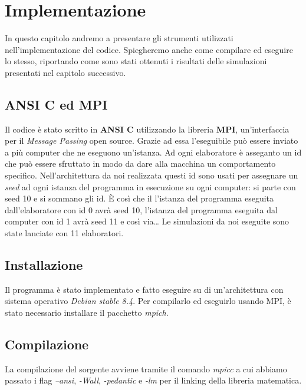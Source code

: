 \chapter{Implementazione}
In questo capitolo andremo a presentare gli strumenti utilizzati
nell'implementazione del codice. Spiegheremo anche come compilare ed eseguire lo
stesso, riportando come sono stati ottenuti i risultati delle simulazioni
presentati nel capitolo successivo.



\section{ANSI C ed MPI}
Il codice è stato scritto in \textbf{ANSI C} utilizzando la libreria
\textbf{MPI}, un'interfaccia per il \textit{Message Passing} open source. Grazie
ad essa l'eseguibile può essere inviato a più computer che ne eseguono
un'istanza. Ad ogni elaboratore è asseganto un id che può essere sfruttato in
modo da dare alla macchina un comportamento specifico.\newline
Nell'architettura da noi realizzata questi id sono usati per assegnare un
\textit{seed} ad ogni istanza del programma in esecuzione su ogni computer: si
parte con seed 10 e si sommano gli id. È così che il l'istanza del programma
eseguita dall'elaboratore con id 0 avrà seed 10, l'istanza del programma
eseguita dal computer con id 1 avrà seed 11 e così via\dots\newline
Le simulazioni da noi eseguite sono state lanciate con 11 elaboratori.



\section{Installazione}
Il programma è stato implementato e fatto eseguire su di un'architettura con
sistema operativo \textit{Debian stable 8.4}. Per compilarlo ed eseguirlo usando
MPI, è stato necessario installare il pacchetto \textit{mpich}.



\section{Compilazione}
La compilazione del sorgente avviene tramite il comando \textit{mpicc} a cui
abbiamo passato i flag \textit{--ansi}, \textit{-Wall}, \textit{-pedantic} e
\textit{-lm} per il linking della libreria matematica.



